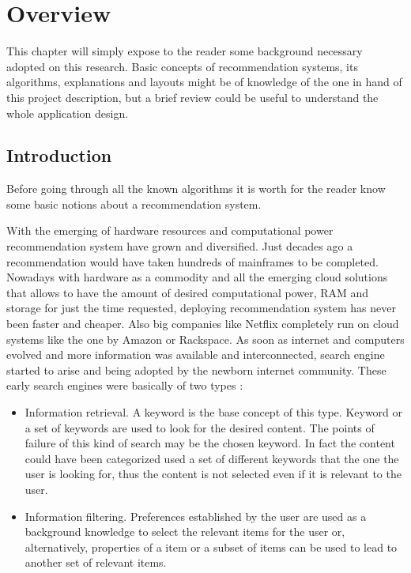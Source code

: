 \chapter{Overview}
\label{chapter:<Overview>}

\acresetall

This   chapter   will   simply   expose   to   the   reader   some   background 
necessary adopted on this research. Basic concepts of recommendation systems, its 
algorithms, explanations and layouts might be of knowledge of the one in hand 
of this project description, but a brief review could be useful to understand the 
whole application design.

\section{Introduction}

Before going through all the known algorithms it is worth for the reader know some basic notions about a recommendation system.

With the emerging of hardware resources and computational power recommendation system have grown and diversified. Just decades ago a recommendation would have taken hundreds of mainframes to be completed. Nowadays with hardware as a commodity and all the emerging cloud solutions that allows to have the amount of desired computational power, RAM and storage for just the time requested, deploying recommendation system has never been faster and cheaper. Also big companies like Netflix completely run on cloud systems like the one by Amazon or Rackspace. 
As soon as internet and computers evolved and more information was available and interconnected, search engine started to arise and being adopted by the newborn internet community. These early search engines were basically of two types \cite{spiegazione_confidenza_raccomandazione}:
\begin{itemize}
\item Information retrieval. A keyword is the base concept of this type. Keyword or a set of keywords are used to look for the desired content. The points of failure of this kind of search may be the chosen keyword. In fact the content could have been categorized used a set of different keywords that the one the user is looking for, thus the content is not selected even if it is relevant to the user.
\item Information filtering. Preferences established by the user are used as a background knowledge to select the relevant items for the user or, alternatively, properties of a item or a subset of items can be used to lead to another set of relevant items.
\end{itemize}


